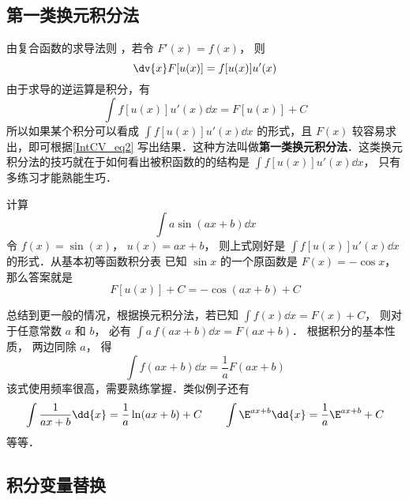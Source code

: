 
\subsection{第一类换元积分法}
由复合函数的求导法则%
，若令 $F'(x) = f(x)$， 则
\begin{equation}
\dv{x}	F[u(x)] = f[u(x)]u'(x)
\end{equation}
由于求导的逆运算是积分，有
\begin{equation}\label{IntCV_eq2}
\int f[u(x)]u'(x) \dd{x}  = F[u(x)] + C
\end{equation}
所以如果某个积分可以看成 $\int f[u(x)]u'(x) \dd{x}$ 的形式，且 $F(x)$ 较容易求出，即可根据\autoref{IntCV_eq2} 写出结果．这种方法叫做\textbf{第一类换元积分法}．这类换元积分法的技巧就在于如何看出被积函数的的结构是 $\int f[u(x)]u'(x) \dd{x}$， 只有多练习才能熟能生巧． 

\begin{exam}{}
计算
\begin{equation}
\int a\sin(ax + b) \dd{x}
\end{equation}
令 $f(x) = \sin(x)$， $u(x) = ax + b$， 则上式刚好是 $\int f[u(x)]u'(x) \dd{x}$ 的形式．从基本初等函数积分表 %
已知 $\sin x$ 的一个原函数是 $F(x) = -\cos x$， 那么答案就是
\begin{equation}
F[u(x)] + C =  - \cos(ax + b) + C
\end{equation}
\end{exam}

总结到更一般的情况，根据换元积分法，若已知 $\int f(x) \dd{x}  = F(x) + C$， 则对于任意常数 $a$ 和 $b$， 必有 $\int a\,f(ax + b) \dd{x} = F(ax + b)$． 根据积分的基本性质，%
两边同除 $a$， 得
\begin{equation}
\int f(ax + b) \dd{x} = \frac{1}{a} F(ax + b)
\end{equation}
该式使用频率很高，需要熟练掌握．类似例子还有
\begin{equation}
\int \frac{1}{ax+b} \dd{x} = \frac{1}{a}\ln (ax + b)+C  \qquad
\int \E^{ax + b} \dd{x} = \frac{1}{a} \E^{ax + b}+C
\end{equation}
等等．

\subsection{积分变量替换}

